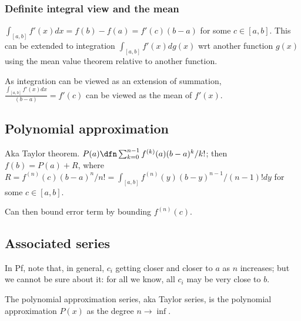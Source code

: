 \documentclass[oneside, article]{memoir}
\begin{document}

\subsubsection{Definite integral view and the mean}
$\int_{[a, b]} f'(x) dx = f(b) - f(a) = f'(c) (b-a)$ for some $c \in [a, b]$. This can be extended to integration $\int_{[a, b]} f'(x) dg(x)$ wrt another function $g(x)$ using the mean value theorem relative to another function.

As integration can be viewed as an extension of summation, $\frac{\int_{[a, b]} f'(x) dx}{(b-a)} = f'(c)$ can be viewed as the mean of $f'(x)$.

\subsection{Polynomial approximation}
Aka Taylor theorem. $P(a)\dfn \sum_{k=0}^{n-1}f^{(k)}(a) (b-a)^{k}/k!$; then $f(b) = P(a) + R$, where $R = f^{(n)}(c)(b-a)^{n}/n! = \int_{[a, b]} f^{(n)}(y)(b-y)^{n-1}/(n-1)! dy$ for some $c \in [a, b]$.

Can then bound error term by bounding $f^{(n)}(c)$.


\subsection{Associated series}
In Pf, note that, in general, $c_i$ getting closer and closer to $a$ as $n$ increases; but we cannot be sure about it: for all we know, all $c_i$ may be very close to $b$.

The polynomial approximation series, aka Taylor series, is the polynomial approximation $P(x)$ as the degree $n \to \inf$.
\end{document}

